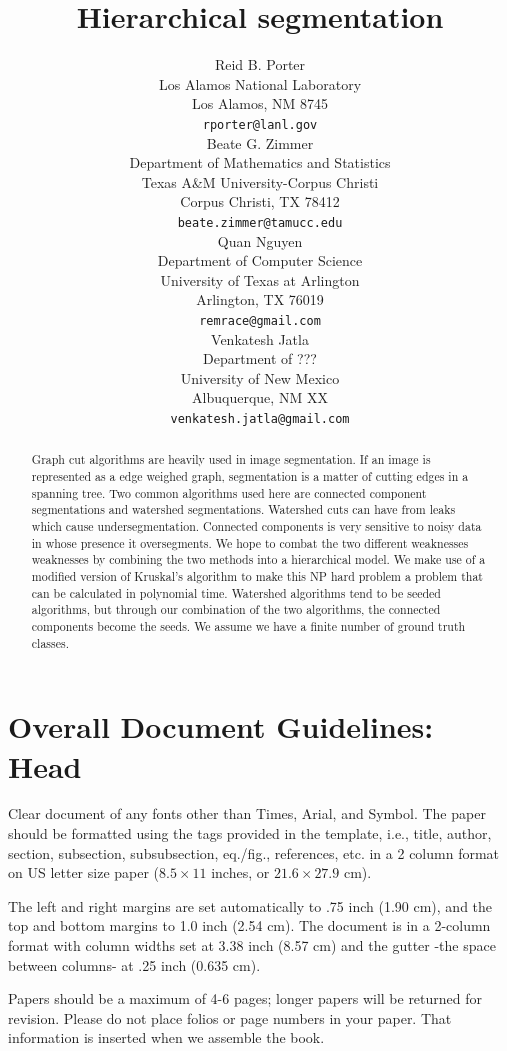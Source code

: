 \documentclass[letterpaper,twocolumn,fleqn]{article}
\title{Hierarchical segmentation}
\author{Reid B. Porter\\
  Los Alamos National Laboratory\\
 Los Alamos, NM 8745 \\
  \texttt{rporter@lanl.gov} \\
   \AND
 Beate G. Zimmer \\
  Department of Mathematics and Statistics\\
  Texas A\&M University-Corpus Christi\\
  Corpus Christi, TX 78412 \\
  \texttt{beate.zimmer@tamucc.edu} \\
  \AND
  Quan Nguyen\\
  Department of Computer Science\\
  University of Texas at Arlington\\
  Arlington, TX 76019 \\
  \texttt{remrace@gmail.com} \\
  \AND
  Venkatesh Jatla\\
  Department of ???\\
  University of New Mexico\\
  Albuquerque, NM XX\\
  \texttt{venkatesh.jatla@gmail.com}
  }
\date{} %
\begin{document}
 

\maketitle 

\thispagestyle{empty} %


\begin{abstract}
Graph cut algorithms are heavily used in image segmentation. If an image is represented as a edge weighed graph, segmentation is a matter of cutting edges in a spanning tree. Two common algorithms used here are  connected component segmentations and watershed segmentations. Watershed cuts can have from leaks which cause undersegmentation. Connected components is very sensitive to noisy data in whose presence it oversegments. We hope to combat the two different weaknesses weaknesses by combining the two methods into a hierarchical model. We make use of a modified version of Kruskal's algorithm to make this NP hard problem a problem that can be calculated in polynomial time. Watershed algorithms tend to be seeded algorithms, but through our combination of the two algorithms, the connected components become the seeds.  We assume we have a finite number of ground truth classes.
\end{abstract}


\section{Overall Document Guidelines: Head}
\label{sec:intro}

Clear document of any fonts other than Times, Arial, and Symbol. The
paper should be formatted using the tags provided in the template,
i.e., title, author, section, subsection, subsubsection, eq./fig.,
references, etc.  in a 2 column format on US letter size paper ($8.5
\times 11$ inches, or $21.6 \times 27.9$ cm).

The left and right margins are set automatically to .75 inch (1.90 cm),
and the top and bottom margins to 1.0 inch (2.54 cm). The document is in
a 2-column format with column widths set at 3.38 inch (8.57 cm) and the
gutter -the space between columns- at .25 inch (0.635 cm).

Papers should be a maximum of 4-6 pages; longer papers will be
returned for revision. Please do not place folios or page numbers in
your paper. That information is inserted when we assemble the book.
\end{document}
